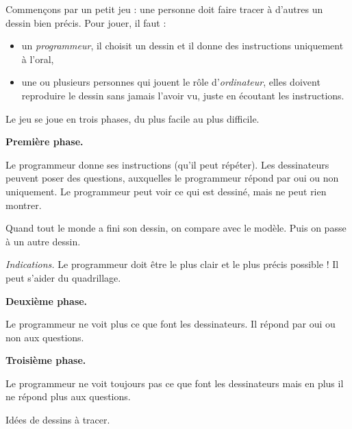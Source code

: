 \documentclass[class=report,crop=false, 12pt]{standalone}
\begin{document}



\begin{activite}
Commençons par un petit jeu : une personne doit faire tracer à d'autres un dessin bien précis.
Pour jouer, il faut :
\begin{itemize}
  \item un \emph{programmeur}, il choisit un dessin et il donne des instructions uniquement à l'oral,
  
  \item une ou plusieurs personnes qui jouent le rôle d'\emph{ordinateur}, elles doivent reproduire le dessin sans jamais l'avoir vu, juste en écoutant les instructions.
  
\end{itemize}


Le jeu se joue en trois phases, du plus facile au plus difficile. 

\bigskip

\textbf{Première phase.}

Le programmeur donne ses instructions (qu'il peut répéter). 
Les dessinateurs peuvent poser des questions, auxquelles 
le programmeur répond par oui ou non uniquement. Le programmeur peut voir ce qui est dessiné, 
mais ne peut rien montrer.

Quand tout le monde a fini son dessin, on compare avec le modèle. Puis on passe à un autre dessin.

\bigskip

\emph{Indications.} Le programmeur doit être le plus clair et le plus précis possible ! Il peut s'aider du quadrillage. 

\bigskip

\textbf{Deuxième phase.}

Le programmeur ne voit plus ce que font les dessinateurs. Il répond par oui ou non aux questions.

\bigskip

\textbf{Troisième phase.}

Le programmeur ne voit toujours pas ce que font les dessinateurs mais en plus il ne répond plus aux questions.

\bigskip
\bigskip

Idées de dessins à tracer.

\end{activite}
\end{document}
